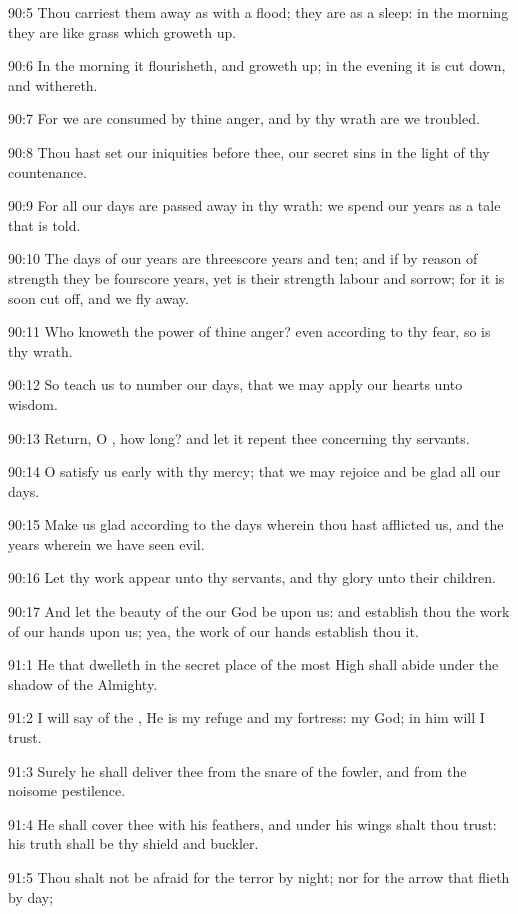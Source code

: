 90:5 Thou carriest them away as with a flood; they are as a sleep: in the morning they are like grass which groweth up.

90:6 In the morning it flourisheth, and groweth up; in the evening it is cut down, and withereth.

90:7 For we are consumed by thine anger, and by thy wrath are we troubled.

90:8 Thou hast set our iniquities before thee, our secret sins in the light of thy countenance.

90:9 For all our days are passed away in thy wrath: we spend our years as a tale that is told.

90:10 The days of our years are threescore years and ten; and if by reason of strength they be fourscore years, yet is their strength labour and sorrow; for it is soon cut off, and we fly away.

90:11 Who knoweth the power of thine anger? even according to thy fear, so is thy wrath.

90:12 So teach us to number our days, that we may apply our hearts unto wisdom.

90:13 Return, O \LORD, how long? and let it repent thee concerning thy servants.

90:14 O satisfy us early with thy mercy; that we may rejoice and be glad all our days.

90:15 Make us glad according to the days wherein thou hast afflicted us, and the years wherein we have seen evil.

90:16 Let thy work appear unto thy servants, and thy glory unto their children.

90:17 And let the beauty of the \LORD our God be upon us: and establish thou the work of our hands upon us; yea, the work of our hands establish thou it.



91:1 He that dwelleth in the secret place of the most High shall abide under the shadow of the Almighty.

91:2 I will say of the \LORD, He is my refuge and my fortress: my God; in him will I trust.

91:3 Surely he shall deliver thee from the snare of the fowler, and from the noisome pestilence.

91:4 He shall cover thee with his feathers, and under his wings shalt thou trust: his truth shall be thy shield and buckler.

91:5 Thou shalt not be afraid for the terror by night; nor for the arrow that flieth by day;

